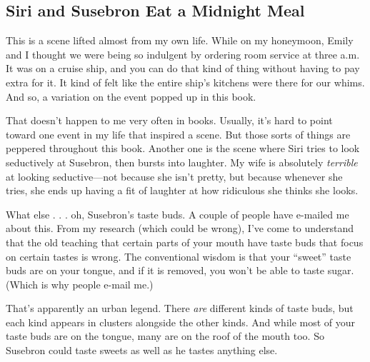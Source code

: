 \subsection*{Siri and Susebron Eat a Midnight Meal}

This is a scene lifted almost from my own life. While on my honeymoon, Emily and I thought we were being so indulgent by ordering room service at three a.m. It was on a cruise ship, and you can do that kind of thing without having to pay extra for it. It kind of felt like the entire ship’s kitchens were there for our whims. And so, a variation on the event popped up in this book.

That doesn’t happen to me very often in books. Usually, it’s hard to point toward one event in my life that inspired a scene. But those sorts of things are peppered throughout this book. Another one is the scene where Siri tries to look seductively at Susebron, then bursts into laughter. My wife is absolutely \textit{terrible} at looking seductive—not because she isn’t pretty, but because whenever she tries, she ends up having a fit of laughter at how ridiculous she thinks she looks.

What else . . . oh, Susebron’s taste buds. A couple of people have e-mailed me about this. From my research (which could be wrong), I’ve come to understand that the old teaching that certain parts of your mouth have taste buds that focus on certain tastes is wrong. The conventional wisdom is that your “sweet” taste buds are on your tongue, and if it is removed, you won’t be able to taste sugar. (Which is why people e-mail me.)

That’s apparently an urban legend. There \textit{are} different kinds of taste buds, but each kind appears in clusters alongside the other kinds. And while most of your taste buds are on the tongue, many are on the roof of the mouth too. So Susebron could taste sweets as well as he tastes anything else.



